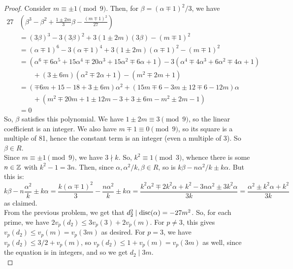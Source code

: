 \begin{proof}
    Consider $m \equiv \pm 1 \pmod{9}$. Then, for $\beta = (\alpha \mp 1)^2/3$, we have
    \begin{align*}
    27 & \left(\beta^3-\beta^2+\frac{1 \pm 2m}{3}\beta - \frac{(m \mp 1)^2}{27}\right) \\
        &= (3\beta)^3-3(3\beta)^2 + 3(1 \pm 2m)(3\beta) - (m \mp 1)^2 \\
        &= (\alpha \mp 1)^6 - 3(\alpha \mp 1)^4 + 3(1 \pm 2m)(\alpha \mp 1)^2 - (m \mp 1)^2 \\
        &= (\alpha^6 \mp 6\alpha^5 + 15\alpha^4 \mp 20\alpha^3 + 15\alpha^2 \mp 6\alpha + 1) - 3(\alpha^4 \mp 4\alpha^3 + 6\alpha^2 \mp 4\alpha + 1) \\
            &\hspace{2em} + (3 \pm 6m)(\alpha^2 \mp 2\alpha + 1) - (m^2 \mp 2m + 1) \\
        &= (\mp 6m+15-18+3 \pm 6m)\alpha^2 + (15m \mp 6 - 3m \pm 12 \mp 6 - 12m)\alpha \\
            &\hspace{2em}+ (m^2 \mp 20m + 1 \pm 12m - 3 + 3 \pm 6m - m^2 \pm 2m - 1) \\
        &= 0
    \end{align*}
    So, $\beta$ satisfies this polynomial. We have $1 \pm 2m \equiv 3 \pmod{9}$, so the linear coefficient is an integer. We also have $m \mp 1 \equiv 0 \pmod{9}$, so its square is a multiple of 81, hence the constant term is an integer (even a multiple of 3). So $\beta \in R$. \\

    Since $m \equiv \pm 1 \pmod{9}$, we have $3 \nmid k$. So, $k^2 \equiv 1 \pmod{3}$, whence there is some $n \in \mathbb{Z}$ with $k^2-1 = 3n$. Then, since $\alpha,\alpha^2/k,\beta \in R$, so is $k\beta-n\alpha^2/k \pm k\alpha$. But this is:
    \[ k\beta-n\frac{\alpha^2}{k} \pm k\alpha = \frac{k(\alpha \mp 1)^2}{3} - \frac{n\alpha^2}{k} \pm k\alpha = \frac{k^2\alpha^2 \mp 2k^2\alpha + k^2 - 3n\alpha^2 \pm 3k^2\alpha}{3k} = \frac{\alpha^2 \pm k^2\alpha + k^2}{3k} \]
    as claimed. \\

    From the previous problem, we get that $d_2^2 \mid \operatorname{disc}(\alpha) = -27m^2$. So, for each prime, we have $2v_p(d_2) \leq 3v_p(3)+2v_p(m)$. For $p \neq 3$, this gives $v_p(d_2) \leq v_p(m) = v_p(3m)$ as desired. For $p=3$, we have $v_p(d_2) \leq 3/2 + v_p(m)$, so $v_p(d_2) \leq 1+v_p(m) = v_p(3m)$ as well, since the equation is in integers, and so we get $d_2 \mid 3m$. \\


\end{proof}
